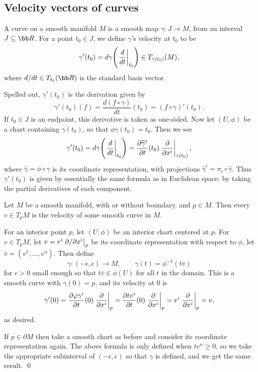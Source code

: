 \subsection{Velocity vectors of curves}

\bdefn

    A {\emphcolor curve} on a smooth manifold $M$ is a smooth map $\gamma\colon J\to M$, from an interval $J\subseteq\bR$.
    For a point $t_0\in J$, we define $\gamma$'s {\emphcolor velocity} at $t_0$ to be
    $$ \gamma'(t_0) = d\gamma\mathopen{}\mathclose{\left(\left.{{d}\over{dt}}\right|_{t_0}\right)} \in T_{\gamma(t_0)}(M) , $$
    where $d/dt\in T_{t_0}(\bR)$ is the standard basis vector.

\edefn

Spelled out, $\gamma'(t_0)$ is the derivation given by
$$ \gamma'(t_0)(f) = \frac{d(f\circ\gamma)}{dt}(t_0) = (f\circ\gamma)'(t_0) . $$
If $t_0\in J$ is an endpoint, this derivative is taken as one-sided.
Now let $(U,\phi)$ be a chart containing $\gamma(t_0)$, so that $\phi\gamma(t_0)=t_0$.
Then we see
$$ \gamma'(t_0) = d\gamma\mathopen{}\mathclose{\left(\left.{{d}\over{dt}}\right|_{t_0}\right)} = {{\partial \widehat\gamma^i}\over{\partial t}}(t_0)\left.{{\partial }\over{\partial x^i}}\right|_{\gamma(t_0)} , $$
where $\hat\gamma=\phi\circ\gamma$ is its coordinate representation, with projections $\hat\gamma^i=\pi_i\circ\hat\gamma$.
Thus $\gamma'(t_0)$ is given by essentially the same formula as in Euclidean space: by taking the partial derivatives of each component.

\bprop

    Let $M$ be a smooth manifold, with or without boundary, and $p\in M$.
    Then every $v\in T_pM$ is the velocity of some smooth curve in $M$.

\eprop

\bproof

    For an interior point $p$, let $(U,\phi)$ be an interior chart centered at $p$.
    For $v\in T_pM$, let $v=v^i\left.\partial /\partial x^i\right|_p$ be its coordinate representation with respect to $\phi$, let $\bar v=(v^1,\dots,v^n)$.
    Then define
    $$ \gamma\colon(-\epsilon,\epsilon)\to M,\qquad \gamma(t)=\phi^{-1}(t\bar v) $$
    for $\epsilon>0$ small enough so that $t\bar v\in\phi(U)$ for all $t$ in the domain.
    This is a smooth curve with $\gamma(0)=p$, and its velocity at $0$ is
    $$ \gamma'(0) = {{\partial \varphi\gamma^i}\over{\partial t}}(0)\left.{{\partial }\over{\partial x^i}}\right|_p = {{\partial tv^i}\over{\partial t}}(0)\left.{{\partial }\over{\partial x^i}}\right|_p = v^i\left.{{\partial }\over{\partial x^i}}\right|_p = v , $$
    as desired.

    If $p\in\partial M$ then take a smooth chart as before and consider its coordinate representation again.
    The above formula is only defined when $tv^n\geq0$, so we take the appropriate subinterval of $(-\epsilon,\epsilon)$ so that $\gamma$ is
    defined, and we get the same result.
    \qed

